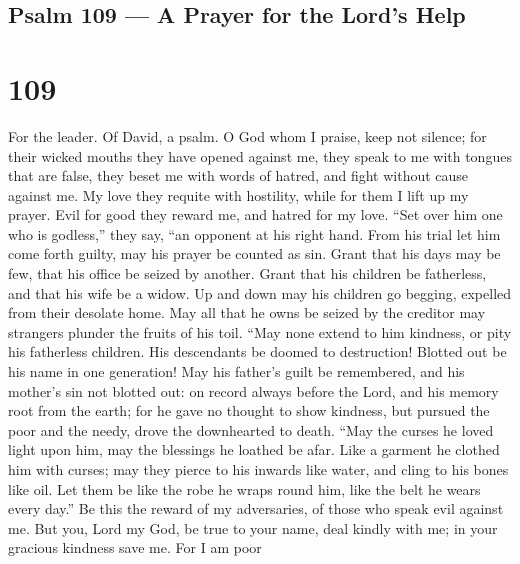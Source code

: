 \hypertarget{psalm-109-a-prayer-for-the-lords-help}{%
\subsection{Psalm 109 --- A Prayer for the Lord's
Help}\label{psalm-109-a-prayer-for-the-lords-help}}

\hypertarget{section-108}{%
\section{109}\label{section-108}}

For the leader. Of David, a psalm.  O God whom I praise,
keep not silence;  for their wicked mouths they have opened
against me, they speak to me with tongues that are false, 
they beset me with words of hatred, and fight without cause against me.
 My love they requite with hostility, while for them I lift
up my prayer.  Evil for good they reward me, and hatred for
my love.  ``Set over him one who is godless,'' they say,
``an opponent at his right hand.  From his trial let him
come forth guilty, may his prayer be counted as sin.  Grant
that his days may be few, that his office be seized by another.
 Grant that his children be fatherless, and that his wife be
a widow.  Up and down may his children go begging, expelled
from their desolate home.  May all that he owns be seized
by the creditor may strangers plunder the fruits of his toil.
 ``May none extend to him kindness, or pity his fatherless
children.  His descendants be doomed to destruction!
Blotted out be his name in one generation!  May his
father's guilt be remembered, and his mother's sin not blotted out:
 on record always before the Lord, and his memory root from
the earth;  for he gave no thought to show kindness, but
pursued the poor and the needy, drove the downhearted to death.
 ``May the curses he loved light upon him, may the
blessings he loathed be afar.  Like a garment he clothed
him with curses; may they pierce to his inwards like water, and cling to
his bones like oil.  Let them be like the robe he wraps
round him, like the belt he wears every day.''  Be this the
reward of my adversaries, of those who speak evil against me.
 But you, Lord my God, be true to your name, deal kindly
with me; in your gracious kindness save me.  For I am poor
